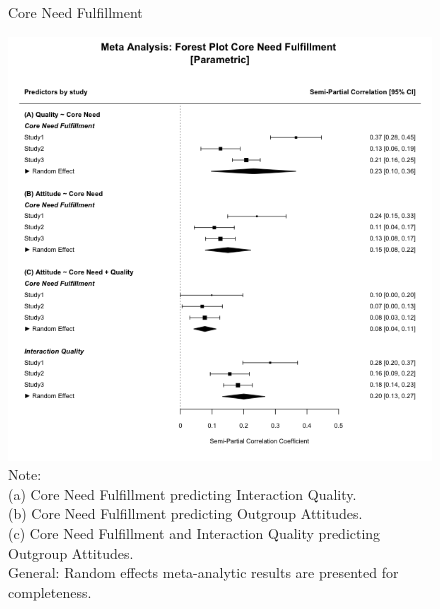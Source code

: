 \documentclass[man, 12pt, a4paper, mask]{apa7}
\theoremstyle{break}
\theoremstyle{plain}
\begin{document}
\begin{figure}
  \caption{Core Need Fulfillment}
  \label{fig:AllportNeedFulfillment}
  \centering\includegraphics[width=\textwidth]{Figures/forestParametricTheoryComb.png}
  \caption*{Note: \\
  (a) Core Need Fulfillment predicting Interaction Quality.\\
  (b) Core Need Fulfillment predicting Outgroup Attitudes.\\
  (c) Core Need Fulfillment and Interaction Quality predicting Outgroup Attitudes.\\
  General: Random effects meta-analytic results are presented for completeness.}
\end{figure}
\end{document}
